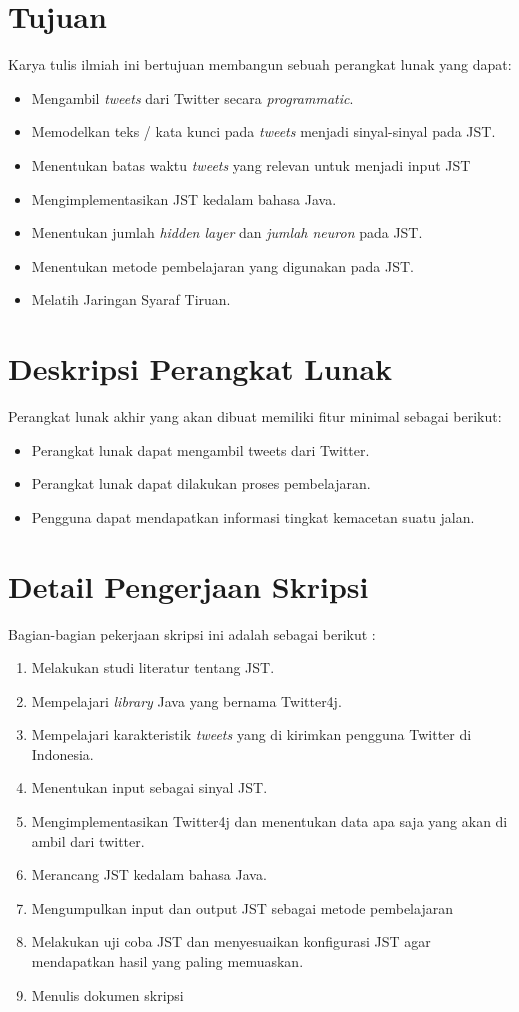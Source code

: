 \documentclass[a4paper,twoside]{article}
\begin{document}
\section{Tujuan}
Karya tulis ilmiah ini bertujuan membangun sebuah perangkat lunak yang dapat:
\begin{itemize}
	\item Mengambil \textit{tweets} dari Twitter secara \textit{programmatic}.
	\item Memodelkan teks / kata kunci pada \textit{tweets} menjadi sinyal-sinyal pada JST.
	\item Menentukan batas waktu \textit{tweets} yang relevan untuk menjadi input JST
	\item Mengimplementasikan JST kedalam bahasa Java.
	\item Menentukan jumlah \textit{hidden layer} dan \textit{jumlah neuron} pada JST.
	\item Menentukan metode pembelajaran yang digunakan pada JST.
	\item Melatih Jaringan Syaraf Tiruan.
\end{itemize}


\section{Deskripsi Perangkat Lunak}
Perangkat lunak akhir yang akan dibuat memiliki fitur minimal sebagai berikut:
\begin{itemize}	
	\item Perangkat lunak dapat mengambil tweets dari Twitter.
	\item Perangkat lunak dapat dilakukan proses pembelajaran.
	\item Pengguna dapat mendapatkan informasi tingkat kemacetan suatu jalan.
\end{itemize}

\section{Detail Pengerjaan Skripsi}
Bagian-bagian pekerjaan skripsi ini adalah sebagai berikut :
	\begin{enumerate}
		\item Melakukan studi literatur tentang JST.
		\item Mempelajari \textit{library} Java yang bernama Twitter4j.
		\item Mempelajari karakteristik \textit{tweets} yang di kirimkan pengguna Twitter di Indonesia.
		\item Menentukan input sebagai sinyal JST.
		\item Mengimplementasikan Twitter4j dan menentukan data apa saja yang akan di ambil dari twitter.
		\item Merancang JST kedalam bahasa Java.
	  \item Mengumpulkan input dan output JST sebagai metode pembelajaran
		\item Melakukan uji coba JST dan menyesuaikan konfigurasi JST agar mendapatkan hasil yang paling memuaskan.
		\item Menulis dokumen skripsi
	\end{enumerate}
\end{document}
